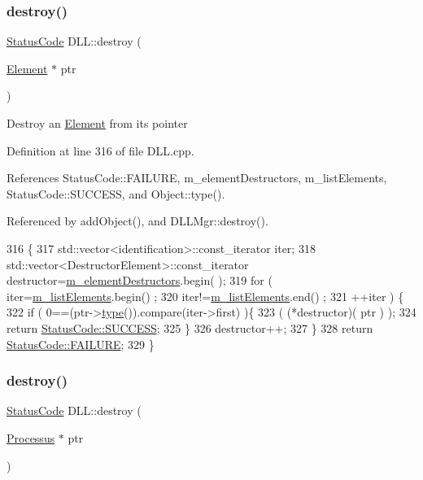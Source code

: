 \subsubsection{\texorpdfstring{destroy()}{destroy()}\hspace{0.1cm}{\footnotesize\ttfamily [1/3]}}
{\footnotesize\ttfamily \hyperlink{classStatusCode}{Status\+Code} D\+L\+L\+::destroy (\begin{DoxyParamCaption}\item[{\hyperlink{classElement}{Element} $\ast$}]{ptr }\end{DoxyParamCaption})}

Destroy an \hyperlink{classElement}{Element} from its pointer 

Definition at line 316 of file D\+L\+L.\+cpp.



References Status\+Code\+::\+F\+A\+I\+L\+U\+RE, m\+\_\+element\+Destructors, m\+\_\+list\+Elements, Status\+Code\+::\+S\+U\+C\+C\+E\+SS, and Object\+::type().



Referenced by add\+Object(), and D\+L\+L\+Mgr\+::destroy().


\begin{DoxyCode}
316                                        \{
317   std::vector<identification>::const\_iterator iter;
318   std::vector<DestructorElement>::const\_iterator destructor=\hyperlink{classDLL_a5004587b4dac5d0ccb0ab99b167ef159}{m\_elementDestructors}.begin(
      );
319   \textcolor{keywordflow}{for} ( iter=\hyperlink{classDLL_a2e88d7167245fd7b6a000817583643ed}{m\_listElements}.begin() ;
320         iter!=\hyperlink{classDLL_a2e88d7167245fd7b6a000817583643ed}{m\_listElements}.end() ;
321         ++iter ) \{
322     \textcolor{keywordflow}{if} ( 0==(ptr->\hyperlink{classObject_a84f99f70f144a83e1582d1d0f84e4e62}{type}()).compare(iter->first) )\{
323       ( (*destructor)( ptr ) );
324       \textcolor{keywordflow}{return} \hyperlink{classStatusCode_a6f565cbeadc76d14c72f047e5e85eb4badd0da38d3ba0d922efd1f4619bc37ad8}{StatusCode::SUCCESS};
325     \}
326     destructor++;
327   \}
328   \textcolor{keywordflow}{return} \hyperlink{classStatusCode_a6f565cbeadc76d14c72f047e5e85eb4ba3da73d4c469762eb9d3c960368252b26}{StatusCode::FAILURE};
329 \}
\end{DoxyCode}
\mbox{\label{classDLL_ac2ca6dfa120f123af42bff6f0b3fec5a}} 
\subsubsection{\texorpdfstring{destroy()}{destroy()}\hspace{0.1cm}{\footnotesize\ttfamily [2/3]}}
{\footnotesize\ttfamily \hyperlink{classStatusCode}{Status\+Code} D\+L\+L\+::destroy (\begin{DoxyParamCaption}\item[{\hyperlink{classProcessus}{Processus} $\ast$}]{ptr }\end{DoxyParamCaption})}

